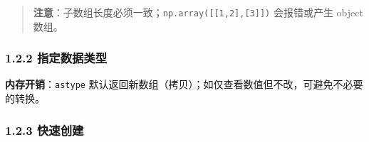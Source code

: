 \begin{Shaded}
\begin{Highlighting}[]
\NormalTok{[[1 2 3]}
\NormalTok{ [4 5 6]] (2, 3) 2}
\end{Highlighting}
\end{Shaded}

\begin{quote}
\textbf{注意}：子数组长度必须一致；\texttt{np.array({[}{[}1,2{]},{[}3{]}{]})}
会报错或产生 object 数组。
\end{quote}

\subsubsection{1.2.2
指定数据类型}\label{ux6307ux5b9aux6570ux636eux7c7bux578b}

\begin{Shaded}
\begin{Highlighting}[]
\OperatorTok{=}\NormalTok{ np.array([}\NormalTok{, }\NormalTok{, }\NormalTok{], dtype}\OperatorTok{=}

\OperatorTok{=}

\OperatorTok{=}
\OperatorTok{=}
\end{Highlighting}
\end{Shaded}

\textbf{内存开销}：\texttt{astype}
默认返回新数组（拷贝）；如仅查看数值但不改，可避免不必要的转换。

\subsubsection{1.2.3 快速创建}\label{ux5febux901fux521bux5efa}

